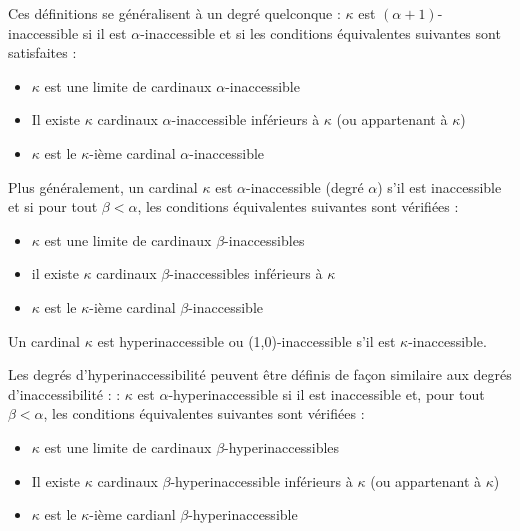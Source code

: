 \documentclass[12pt]{beamer}
\begin{document}
\begin{frame}

Ces définitions se généralisent à un degré quelconque : \( \kappa \) est \((\alpha+1)\)-inaccessible si il est \(\alpha\)-inaccessible et si les conditions équivalentes suivantes sont satisfaites : 

\begin{itemize}
     \setlength{\itemsep}{1pt}
     \setlength{\parskip}{0pt}
     \setlength{\parsep}{0pt}
\item \(\kappa\) est une limite de cardinaux \(\alpha\)-inaccessible 
\item Il existe \(\kappa\) cardinaux \(\alpha\)-inaccessible inférieurs à \(\kappa\) (ou appartenant à \(\kappa\))
\item \(\kappa\) est le \(\kappa\)-ième cardinal \(\alpha\)-inaccessible 
\end{itemize}


Plus généralement, un cardinal \( \kappa \) est $\alpha$-inaccessible (degré $\alpha$) s'il est inaccessible et si pour tout \( \beta < \alpha \), les conditions équivalentes suivantes sont vérifiées :

\begin{itemize}
     \setlength{\itemsep}{1pt}
     \setlength{\parskip}{0pt}
     \setlength{\parsep}{0pt}
\item $\kappa$ est une limite de cardinaux $\beta$-inaccessibles
\item il existe $\kappa$ cardinaux $\beta$-inaccessibles inférieurs à $\kappa$
\item $\kappa$ est le $\kappa$-ième cardinal $\beta$-inaccessible
\end{itemize}

\end{frame}
\begin{frame}

Un cardinal $\kappa$ est hyperinaccessible ou (1,0)-inaccessible s'il est $\kappa$-inaccessible.

Les degrés d'hyperinaccessibilité peuvent être définis de façon similaire aux degrés d'inaccessibilité : : \(\kappa\) est \(\alpha\)-hyperinaccessible si il est inaccessible et, pour tout \( \beta < \alpha \), les conditions équivalentes suivantes sont vérifiées : 

\begin{itemize}
     \setlength{\itemsep}{1pt}
     \setlength{\parskip}{0pt}
     \setlength{\parsep}{0pt}
\item \(\kappa\) est une limite de cardinaux \(\beta\)-hyperinaccessibles
\item Il existe \(\kappa\) cardinaux \(\beta\)-hyperinaccessible inférieurs à \(\kappa\) (ou appartenant à \(\kappa\))
\item \(\kappa\) est le \(\kappa\)-ième cardianl \(\beta\)-hyperinaccessible 
\end{itemize}

\end{frame}
\end{document}
